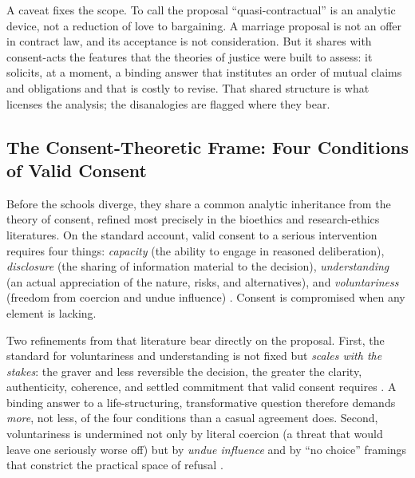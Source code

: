 A caveat fixes the scope. To call the proposal ``quasi-contractual'' is an analytic device, not a reduction of love to bargaining. A marriage proposal is not an offer in contract law, and its acceptance is not consideration. But it shares with consent-acts the features that the theories of justice were built to assess: it solicits, at a moment, a binding answer that institutes an order of mutual claims and obligations and that is costly to revise. That shared structure is what licenses the analysis; the disanalogies are flagged where they bear.

\subsection{The Consent-Theoretic Frame: Four Conditions of Valid Consent}\label{p06:sec:consent}

Before the schools diverge, they share a common analytic inheritance from the theory of consent, refined most precisely in the bioethics and research-ethics literatures. On the standard account, valid consent to a serious intervention requires four things: \emph{capacity} (the ability to engage in reasoned deliberation), \emph{disclosure} (the sharing of information material to the decision), \emph{understanding} (an actual appreciation of the nature, risks, and alternatives), and \emph{voluntariness} (freedom from coercion and undue influence) \parencite{eyal2019informed, beauchamp2019principles}. Consent is compromised when any element is lacking.

Two refinements from that literature bear directly on the proposal. First, the standard for voluntariness and understanding is not fixed but \emph{scales with the stakes}: the graver and less reversible the decision, the greater the clarity, authenticity, coherence, and settled commitment that valid consent requires \parencite{roberts2002voluntarism}. A binding answer to a life-structuring, transformative question therefore demands \emph{more}, not less, of the four conditions than a casual agreement does. Second, voluntariness is undermined not only by literal coercion (a threat that would leave one seriously worse off) but by \emph{undue influence} and by ``no choice'' framings that constrict the practical space of refusal \parencite{eyal2019informed}.

